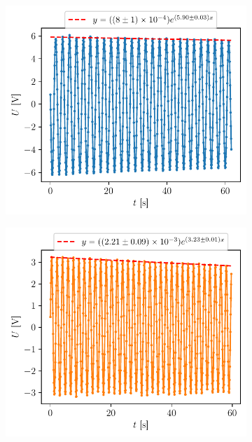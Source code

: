 \begin{figure}[h]
    \centering
    \begin{subfigure}{0.45\linewidth}
        \centering
        \includegraphics[width=\linewidth]{figures/laiton1.pdf}
        \caption{}
        \label{fig:dynamique_laiton}
    \end{subfigure}
    \begin{subfigure}{0.45\linewidth}
        \centering
        \includegraphics[width=\linewidth]{figures/acier1.pdf}

\end{subfigure}
\end{figure}
